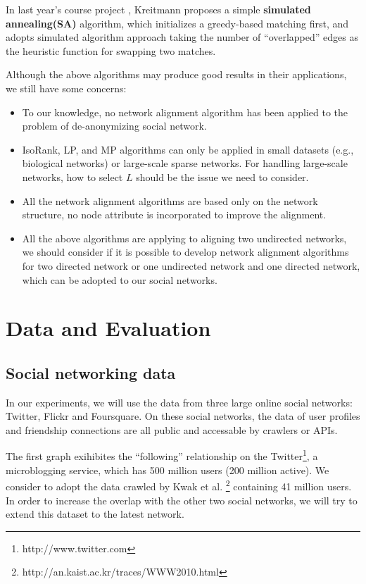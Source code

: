 \documentclass[11pt,letterpaper]{article}
\begin{document}
In last year's course project \cite{Kreitmann2011}, Kreitmann proposes a simple \textbf{simulated annealing(SA)} algorithm, which initializes a greedy-based matching first, and adopts simulated algorithm approach taking the number of ``overlapped'' edges as the heuristic function for swapping two matches. 

Although the above algorithms may produce good results in their applications, we still have some concerns:
\begin{itemize}
   \item
      To our knowledge, no network alignment algorithm has been applied to the problem of de-anonymizing social network.
   \item
      IsoRank, LP, and MP algorithms can only be applied in small datasets (e.g., biological networks) or large-scale sparse networks. For handling large-scale networks, how to select $L$ should be the issue we need to consider. 
   \item
      All the network alignment algorithms are based only on the network structure, no node attribute is incorporated to improve the alignment. 
   \item
      All the above algorithms are applying to aligning two undirected networks, we should consider if it is possible to develop network alignment algorithms for two directed network or one undirected network and one directed network, which can be adopted to our social networks. 
\end{itemize}

\section{Data and Evaluation}

\subsection{Social networking data}
 In our experiments, we will use the data from three large online social networks: Twitter, Flickr and Foursquare. On these social networks, the data of user profiles and friendship connections are all public and accessable by crawlers or APIs. 

The first graph exihibites the ``following'' relationship on the Twitter\footnote{http://www.twitter.com}, a microblogging service, which has 500 million users (200 million active). We consider to adopt the data crawled by  Kwak et al. \footnote{http://an.kaist.ac.kr/traces/WWW2010.html} containing 41 million users. In order to increase the overlap with the other two social networks, we will try to extend this dataset to the latest network. 
\end{document}
